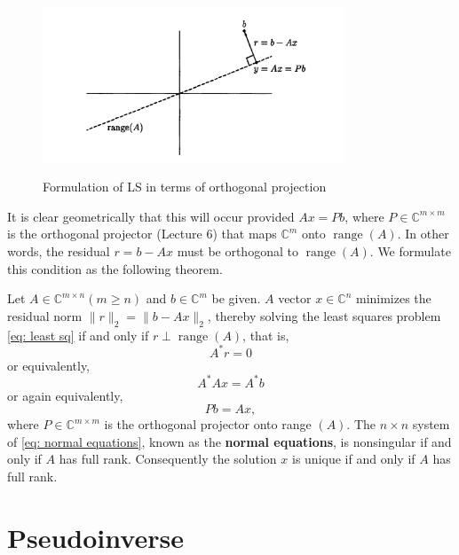 \begin{figure}[H]
    \centering
    \includegraphics[width=0.8\textwidth]{figures/11-1.png}
    \label{fig 11.3} 
    \caption{Formulation of LS in terms of orthogonal projection}
\end{figure}

It is clear geometrically that this will occur provided $A x=P b$, where $P \in \mathbb{C}^{m \times m}$ is the orthogonal projector (Lecture 6) that maps $\mathbb{C}^m$ onto $\operatorname{range}(A)$. In other words, the residual $r=b-A x$ must be orthogonal to $\operatorname{range}(A)$. We formulate this condition as the following theorem.


\begin{theorem}
\label{thm: LS}
Let $A \in \mathbb{C}^{m \times n}(m \geq n)$ and $b \in \mathbb{C}^m$ be given. $A$ vector $x \in \mathbb{C}^n$ minimizes the residual norm $\|r\|_2=\|b-A x\|_2$, thereby solving the least squares problem \autoref{eq: least sq} if and only if $r \perp \operatorname{range}(A)$, that is,
$$
A^* r=0
$$
or equivalently,
\begin{equation}
    \label{eq: normal equations}
    A^* A x=A^* b
\end{equation}
or again equivalently,
$$
P b=A x,
$$
where $P \in \mathbb{C}^{m \times m}$ is the orthogonal projector onto range $(A)$. The $n \times n$ system of \autoref{eq: normal equations}, known as the \textbf{normal equations}, is nonsingular if and only if $A$ has full rank. Consequently the solution $x$ is unique if and only if $A$ has full rank.
\end{theorem}

\section{Pseudoinverse}


